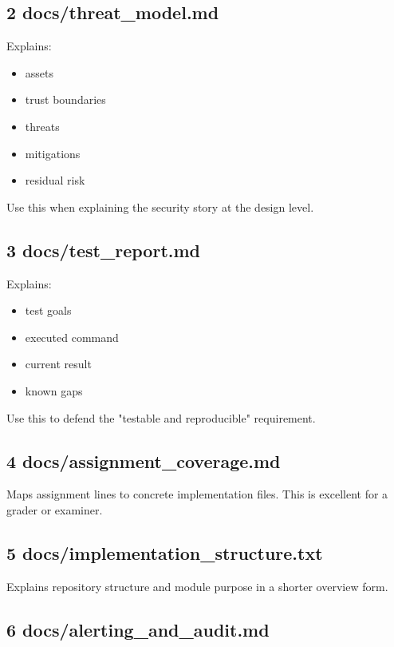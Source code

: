 \documentclass[11pt,a4paper]{article}
\begin{document}
\subsection{2 docs/threat\_model.md}

Explains:

\begin{itemize}
\item assets
\item trust boundaries
\item threats
\item mitigations
\item residual risk
\end{itemize}

Use this when explaining the security story at the design level.

\subsection{3 docs/test\_report.md}

Explains:

\begin{itemize}
\item test goals
\item executed command
\item current result
\item known gaps
\end{itemize}

Use this to defend the "testable and reproducible" requirement.

\subsection{4 docs/assignment\_coverage.md}

Maps assignment lines to concrete implementation files. This is excellent for a grader or examiner.

\subsection{5 docs/implementation\_structure.txt}

Explains repository structure and module purpose in a shorter overview form.

\subsection{6 docs/alerting\_and\_audit.md}
\end{document}
